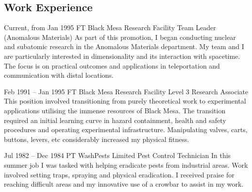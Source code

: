 \documentclass[
	10pt, %
]{FreemanCV}
\begin{document}
\begin{paracol}{2}
\section{Work Experience}





\jobentry
	{Current, from Jan 1995} %
	{FT} %
	{Black Mesa Research Facility} %
	{Team Leader (Anomalous Materials)} %
	{As part of this promotion, I began conducting nuclear and subatomic research in the Anomalous Materials department. My team and I are particularly interested in dimensionality and its interaction with spacetime. The focus is on practical outcomes and applications in teleportation and communication with distal locations.} %


\jobentry
	{Feb 1991 -- Jan 1995} %
	{FT} %
	{Black Mesa Research Facility} %
	{Level 3 Research Associate} %
	{This position involved transitioning from purely theoretical work to experimental applications utilising the immense resources of Black Mesa. The transition required an initial learning curve in hazard containment, health and safety procedures and operating experimental infrastructure. Manipulating valves, carts, buttons, levers, etc considerably increased my physical fitness.} %


\jobentry
	{Jul 1982 -- Dec 1984} %
	{PT} %
	{WashPests Limited} %
	{Pest Control Technician} %
	{In this summer job I was tasked with helping eradicate pests from industrial areas. Work involved setting traps, spraying and physical eradication. I received praise for reaching difficult areas and my innovative use of a crowbar to assist in my work.} %



\end{paracol}
\end{document}
